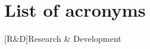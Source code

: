 \chapter{List of acronyms}

\begin{acronym}[Acronyms]
  [R\&D]{Research \& Development}
\end{acronym}